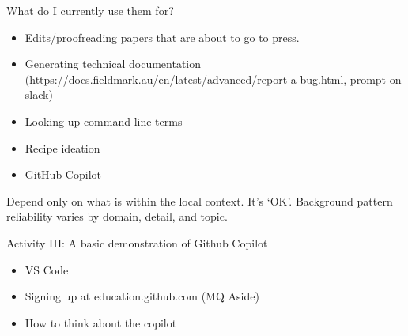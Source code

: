 \documentclass[aspectratio=169]{beamer}
\begin{document}
\begin{frame}{What do I currently use them for?}
    \begin{itemize}
        \item Edits/proofreading papers that are about to go to press.
	\item Generating technical documentation (https://docs.fieldmark.au/en/latest/advanced/report-a-bug.html, prompt on slack)
	\item Looking up command line terms
        \item Recipe ideation
        \item GitHub Copilot
    \end{itemize}
\vspace{1em}
{\Large Depend only on what is within the local context. It's `OK'. Background pattern reliability varies by domain, detail, and topic.}
		
\end{frame}
\begin{frame}{Activity III: A basic demonstration of Github Copilot}

\begin{itemize}
    \item VS Code
    \item Signing up at education.github.com (MQ Aside)
    \item How to think about the copilot
\end{itemize}
    
\end{frame}
\end{document}
